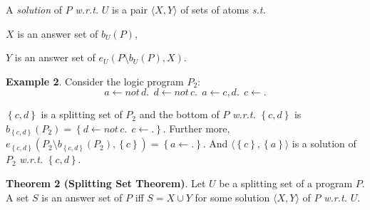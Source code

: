 \documentclass[landscape,final,a0paper,fontscale=0.285]{baposter}
\newtheorem{theorem}{Theorem}
\newenvironment{tight_itemize}{
\begin{itemize}
\setlength{\itemsep}{0pt}%
  \setlength{\topsep}{0pt}%
  \setlength{\partopsep}{0pt}%
  \setlength{\parskip}{0pt}%
  \setlength{\parsep}{0pt}%
}{\end{itemize}}
\newcommand\st{{\it s.t. }}
\newcommand\wrt{{\it w.r.t. }}
\newcommand{\set}[1]{\left\{#1\right\}}
\newcommand{\Not}{not \,}
\begin{document}
\begin{poster}
{    \par
    A {\em solution} of $P$ \wrt $U$ is a pair $\langle X, Y\rangle$ of sets of atoms \st
    \begin{tight_itemize}
      \item $X$ is an answer set of $b_U(P)$,
      \item $Y$ is an answer set of $e_U(P\setminus b_U(P), X)$.
    \end{tight_itemize}

    \smallskip
    {\bf Example 2}. Consider the logic program $P_2$:
     \[   a \gets \Not d.\ \ d \gets \Not c.\ \ a \gets c, d.\ \ c \gets .
     \]
    \par
    $\set{c, d}$ is a splitting set of $P_2$ and the bottom of $P$ \wrt $\set{c,d}$ is $b_{\set{c, d}}(P_2) = \set{ d\gets\Not c.\ \ c\gets.}$. Further more, $e_{\set{c,d}}(P_2\setminus b_{\set{c,d}}(P_2), \set{c}) = \set{ a\gets.}$. And $\langle \set{c}, \set{a}\rangle$ is a solution of $P_2$ \wrt $\set{c,d}$.

    \par
    {\bf Theorem 2 (Splitting Set Theorem)}. Let $U$ be a splitting set of a program $P$. A set $S$ is an answer set of $P$ iff $S = X\cup Y$ for some solution $\langle X, Y\rangle$ of $P$ \wrt $U$.

  }
\end{poster}
\end{document}
